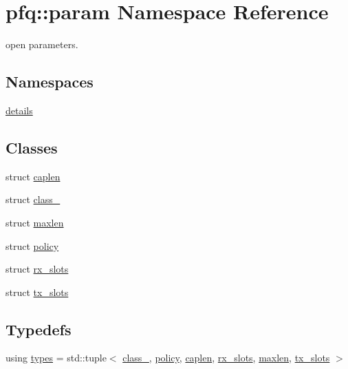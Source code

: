 \hypertarget{namespacepfq_1_1param}{\section{pfq\+:\+:param Namespace Reference}
\label{namespacepfq_1_1param}
}


open parameters.  


\subsection*{Namespaces}
\begin{DoxyCompactItemize}
\item 
 \hyperlink{namespacepfq_1_1param_1_1details}{details}
\end{DoxyCompactItemize}
\subsection*{Classes}
\begin{DoxyCompactItemize}
\item 
struct \hyperlink{structpfq_1_1param_1_1caplen}{caplen}
\item 
struct \hyperlink{structpfq_1_1param_1_1class__}{class\+\_\+}
\item 
struct \hyperlink{structpfq_1_1param_1_1maxlen}{maxlen}
\item 
struct \hyperlink{structpfq_1_1param_1_1policy}{policy}
\item 
struct \hyperlink{structpfq_1_1param_1_1rx__slots}{rx\+\_\+slots}
\item 
struct \hyperlink{structpfq_1_1param_1_1tx__slots}{tx\+\_\+slots}
\end{DoxyCompactItemize}
\subsection*{Typedefs}
\begin{DoxyCompactItemize}
\item 
using \hyperlink{namespacepfq_1_1param_ac57f6024bbd9785360348778c1105909}{types} = std\+::tuple$<$ \hyperlink{structpfq_1_1param_1_1class__}{class\+\_\+}, \hyperlink{structpfq_1_1param_1_1policy}{policy}, \hyperlink{structpfq_1_1param_1_1caplen}{caplen}, \hyperlink{structpfq_1_1param_1_1rx__slots}{rx\+\_\+slots}, \hyperlink{structpfq_1_1param_1_1maxlen}{maxlen}, \hyperlink{structpfq_1_1param_1_1tx__slots}{tx\+\_\+slots} $>$
\end{DoxyCompactItemize}
